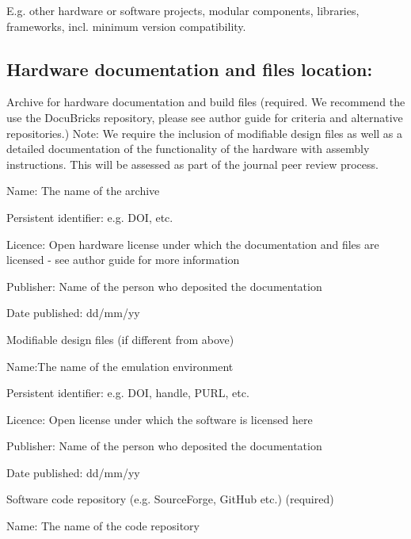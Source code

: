 \documentclass[a4paper]{article}
\begin{document}
E.g. other hardware or software projects, modular components,
libraries, frameworks, incl. minimum version compatibility.


\subsection{Hardware documentation and files location:}\label{h.nbisrsde6sc3}

Archive for hardware documentation and build files (required.
We recommend the use the DocuBricks repository, please see author guide for criteria and alternative
repositories.) Note: We require the inclusion of modifiable design
files as well as a detailed documentation of the functionality of the
hardware with assembly instructions. This will be assessed as part of
the journal peer review process.

Name: The name of the archive

Persistent identifier: e.g. DOI, etc.

Licence: Open hardware license under which the documentation and
files are licensed - see author guide for more information

Publisher: Name of the person who deposited the documentation

Date published: dd/mm/yy

Modifiable design files (if different from above)

Name:The name of the emulation environment

Persistent identifier: e.g. DOI, handle, PURL, etc.

Licence: Open license under which the software is licensed here

Publisher: Name of the person who deposited the documentation

Date published: dd/mm/yy

Software code repository (e.g. SourceForge, GitHub etc.)
(required)

Name: The name of the code repository
\end{document}
